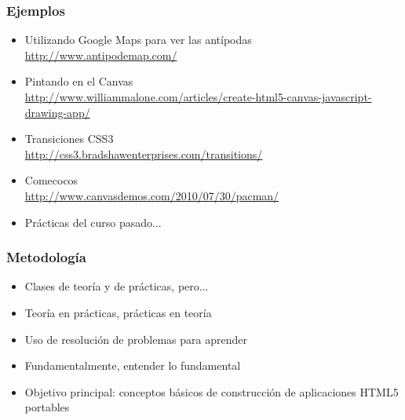 
\begin{frame}
\frametitle{Ejemplos}

\vspace{1cm}

\begin{itemize}
  \item Utilizando Google Maps para ver las antípodas \\
    \url{http://www.antipodemap.com/}
  \item Pintando en el Canvas \\
    \url{http://www.williammalone.com/articles/create-html5-canvas-javascript-drawing-app/}
  \item Transiciones CSS3 \\
    \url{http://css3.bradshawenterprises.com/transitions/}
  \item Comecocos \\ 
    \url{http://www.canvasdemos.com/2010/07/30/pacman/}
  \item Prácticas del curso pasado...
\end{itemize}

\end{frame}


\begin{frame}
\frametitle{Metodología}

\vspace{1cm}

\begin{itemize}
\item Clases de teoría y de prácticas, pero...
\item Teoría en prácticas, prácticas en teoría
\item Uso de resolución de problemas para aprender
\item Fundamentalmente, entender lo fundamental
\item Objetivo principal: conceptos básicos de construcción de aplicaciones HTML5 portables
\end{itemize}

\end{frame}



